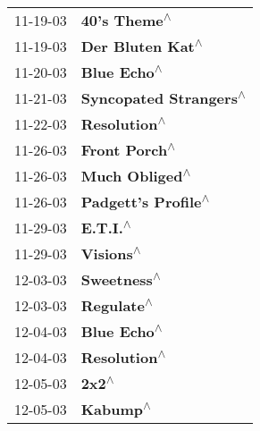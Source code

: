 \begin{supertabular}{p{0.25\columnwidth}p{0.75\columnwidth}}
 11-19-03 &                                                               \textbf{40's Theme\textsuperscript{$\wedge$}} \\
 11-19-03 &                                                           \textbf{Der Bluten Kat\textsuperscript{$\wedge$}} \\
 11-20-03 &                                                                \textbf{Blue Echo\textsuperscript{$\wedge$}} \\
 11-21-03 &                                                     \textbf{Syncopated Strangers\textsuperscript{$\wedge$}} \\
 11-22-03 &                                                               \textbf{Resolution\textsuperscript{$\wedge$}} \\
 11-26-03 &                                                              \textbf{Front Porch\textsuperscript{$\wedge$}} \\
 11-26-03 &                                                             \textbf{Much Obliged\textsuperscript{$\wedge$}} \\
 11-26-03 &                                                        \textbf{Padgett's Profile\textsuperscript{$\wedge$}} \\
 11-29-03 &                                                                   \textbf{E.T.I.\textsuperscript{$\wedge$}} \\
 11-29-03 &                                                                  \textbf{Visions\textsuperscript{$\wedge$}} \\
 12-03-03 &                                                                \textbf{Sweetness\textsuperscript{$\wedge$}} \\
 12-03-03 &                                                                 \textbf{Regulate\textsuperscript{$\wedge$}} \\
 12-04-03 &                                                                \textbf{Blue Echo\textsuperscript{$\wedge$}} \\
 12-04-03 &                                                               \textbf{Resolution\textsuperscript{$\wedge$}} \\
 12-05-03 &                                                                      \textbf{2x2\textsuperscript{$\wedge$}} \\
 12-05-03 &                                                                   \textbf{Kabump\textsuperscript{$\wedge$}} \\

\end{supertabular}
